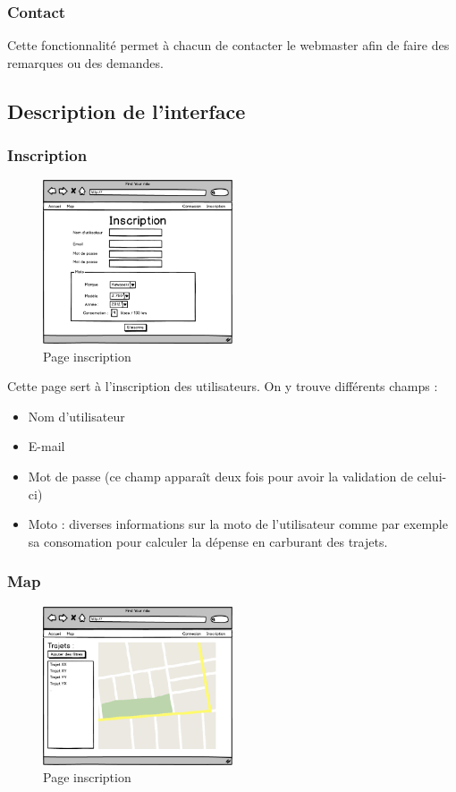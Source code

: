 \documentclass[a4paper]{article}
\begin{document}
\subsubsection{Contact}
Cette fonctionnalité permet à chacun de contacter le webmaster afin de faire des remarques ou des demandes.

\newpage

\subsection{Description de l'interface}

\subsubsection{Inscription}
\begin{figure}[h]
\centering
\includegraphics[width=0.5\textwidth]{./Images/Interfaces/inscription.png}
\caption{Page inscription}
\end{figure}

Cette page sert à l'inscription des utilisateurs. On y trouve différents champs : 
\begin{itemize}
    \item Nom d'utilisateur
    \item E-mail
    \item Mot de passe (ce champ apparaît deux fois pour avoir la validation de celui-ci)
    \item Moto : diverses informations sur la moto de l'utilisateur comme par exemple sa consomation pour calculer la dépense en carburant des trajets.
\end{itemize}

\subsubsection{Map}
\begin{figure}[h]
\centering
\includegraphics[width=0.5\textwidth]{./Images/Interfaces/Map.png}
\caption{Page inscription}
\end{figure}
\end{document}
